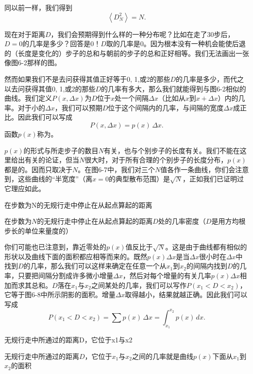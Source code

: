 \documentclass[12pt,oneside]{book}
\begin{document}
\begin{common-format}
同以前一样，我们得到
\begin{equation}
\label{Eq:I:6:16}
\left <D_N^2\right > =N.
\end{equation}

现在对于距离$D$，我们会预期得到什么样的一种分布呢？比如在走了30步后，$D=0$的几率是多少？回答是$0$！$D$取的几率是0。因为根本没有一种机会能使后退的（长度是变化的）步子的总和与朝前的步子的总和正好相等。我们无法画出一张像图6-2那样的图。

然而如果我们不是去问获得其值正好等于0, 1,或2的那些$D$的几率是多少，而代之以去问获得其值0, 1,或2的那些$D$的几率有多大，那么我们就能得到与图6-2相似的曲线。我们定义$P(x,\Delta x)$为$D$位于$x$处一个间隔$\Delta x$（比如从$x$到$x+\Delta x$）内的几率。对于小的$\Delta x$，我们可以预期$D$位于这个间隔内的几率，与间隔的宽度$\Delta x$成正比。因此我们可以写成
\begin{equation}
\label{Eq:I:6:17}
P(x,\Delta x)=p(x)\,\Delta x.
\end{equation}
函数$p(x)$称为。

$p(x)$的形式与所走步子的数目$N$有关，也与个别步子的长度有关。我们不能在这里给出有关的论证，但当$N$很大时，对于所有合理的个别步子的长度分布，$p(x)$都是的。因而只取决于$N$。在图6-7中，我们对三个$N$值各作一条曲线，你们会注意到，这些曲线的“半宽度”（离$x=0$的典型散布范围）是$\sqrt{N}$，正如我们已证明过它理应如此。
\begin{linefig}{在步数为N的无规行走中停止在从起点算起的距离}
\caption{\footnotesize 在步数为$N$的无规行走中停止在从起点算起的距离$D$处的几率密度（$D$是用方均根步长的单位来量度的）}
\label{fig:在步数为N的无规行走中停止在从起点算起的距离}
\end{linefig}

你们可能也已注意到，靠近零处的$p(x)$值反比于$\sqrt{N}$。这是由于曲线都有相似的形状以及曲线下面的面积都应相等而来的。既然$p(x)\Delta x$是当$\Delta x$很小时在$\Delta x$中找到$D$的几率，那么我们可以这样来确定在任意一个从$x_1$到$x_2$的间隔内找到$D$的几率，只要把间隔分割成许多微小增量$\Delta x$，然后对每个增量的有关几率$p(x)\Delta x$相加而求其总和。$D$落在$x_1$与$x_2$之间某处的几率，我们可以写作$P(x_1 < D < x_2)$，它等于图6-8中所示阴影的面积。增量$\Delta x$取得越小，结果就越正确。因此我们可以写成
\begin{equation}
\label{Eq:I:6:18}
P(x_1 < D < x_2)=\sum p(x)\,\Delta x=\int_{x_1}^{x_2}p(x)\,dx.
\end{equation}
\begin{fig}{无规行走中所通过的距离D，它位于x1与x2}
\caption{\footnotesize 无规行走中所通过的距离$D$，它位于$x_1$与$x_2$之间的几率就是曲线$p(x)$下面从$x_1$到$x_2$的面积}
\label{fig:无规行走中所通过的距离D，它位于x1与x2}
\end{fig}


\end{common-format}
\end{document}

